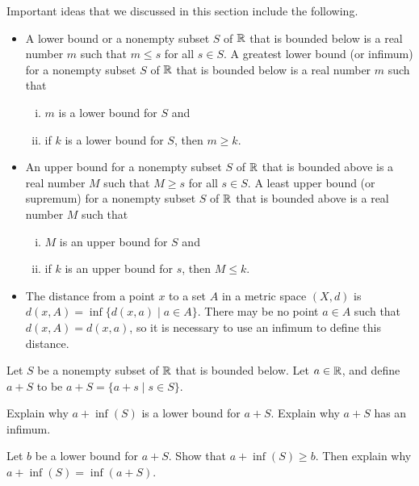 Important ideas that we discussed in this section include the following.
\begin{itemize}

\item  A lower bound or a nonempty subset $S$ of $\mathbb{R}$ that is bounded below is a real number $m$ such that $m \leq s$ for all $s \in S$. A greatest lower bound (or infimum) for a nonempty subset $S$ of $\mathbb{R}$ that is bounded below is a real number $m$ such that 
\begin{enumerate}[i.]
\item $m$ is a lower bound for $S$ and
\item if $k$ is a lower bound for $S$, then $m \geq k$. 
\end{enumerate}
\item An upper bound for a nonempty subset $S$ of $\mathbb{R}$ that is bounded above is a real number $M$ such that $M \geq s$ for all $s \in S$. A least upper bound (or supremum) for a nonempty subset $S$ of $\mathbb{R}$ that is bounded above is a real number $M$ such that 
\begin{enumerate}[i.]
\item $M$ is an upper bound for $S$ and
\item if $k$ is an upper bound for $s$, then $M \leq k$. 
\end{enumerate}

\item The distance from a point $x$ to a set $A$ in a metric space $(X,d)$ is $d(x,A) = \inf \{d(x,a) \mid a \in A\}$. There may be no point $a \in A$ such that $d(x,A) = d(x,a)$, so it is necessary to use an infimum to define this distance.

\end{itemize}


\be

\item Let $S$ be a nonempty subset of $\mathbb{R}$ that is bounded below. Let $a \in \mathbb{R}$, and define $a+S$ to be $a+S = \{a+s \mid s \in S\}$. 
\ba
	\item Explain why $a+\inf(S)$ is a lower bound for $a+S$. Explain why $a+S$ has an infimum. 
	
 	\item Let $b$ be a lower bound for $a+S$. Show that $a + \inf(S) \geq b$. Then explain why $a+\inf(S) = \inf(a+S)$.   

\ea

